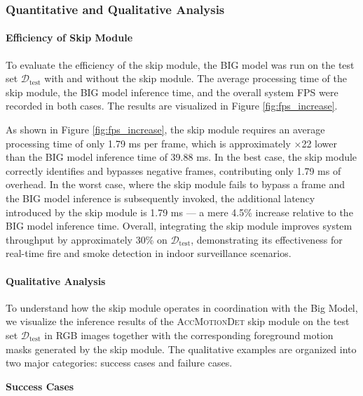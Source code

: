 \documentclass[
  10pt,
]{article}
\begin{document}
\subsubsection{Quantitative and Qualitative
Analysis}\label{quantitative-and-qualitative-analysis}

\paragraph{Efficiency of Skip Module}\label{efficiency-of-skip-module}



To evaluate the efficiency of the skip module, the BIG model was run on
the test set \(\mathcal{D}_\text{test}\) with and without the skip
module. The average processing time of the skip module, the BIG model
inference time, and the overall system FPS were recorded in both cases.
The results are visualized in Figure \ref{fig:fps_increase}.

As shown in Figure \ref{fig:fps_increase}, the skip module requires an
average processing time of only 1.79 ms per frame, which is
approximately ×22 lower than the BIG model inference time of 39.88 ms.
In the best case, the skip module correctly identifies and bypasses
negative frames, contributing only 1.79 ms of overhead. In the worst
case, where the skip module fails to bypass a frame and the BIG model
inference is subsequently invoked, the additional latency introduced by
the skip module is 1.79 ms --- a mere 4.5\% increase relative to the BIG
model inference time. Overall, integrating the skip module improves
system throughput by approximately 30\% on \(\mathcal{D}_\text{test}\),
demonstrating its effectiveness for real-time fire and smoke detection
in indoor surveillance scenarios.

\paragraph{Qualitative Analysis}\label{qualitative-analysis}

To understand how the skip module operates in coordination with the Big
Model, we visualize the inference results of the \textsc{AccMotionDet}
skip module on the test set \(\mathcal{D}_\text{test}\) in RGB images
together with the corresponding foreground motion masks generated by the
skip module. The qualitative examples are organized into two major
categories: success cases and failure cases.

\textbf{Success Cases}
\end{document}

